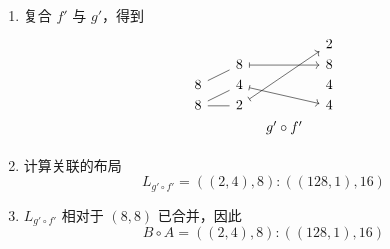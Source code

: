 \begin{example}
\begin{enumerate}
        \item 复合 $f'$ 与 $g'$，得到
        \[ \begin{tikzcd} [row sep = 1, column sep = 8]
         & & & & 2\\
         & & 8 \ar[rr,mapsto] & & 8\\
        8 \ar[urr,-] & & 4 \ar[drr,mapsto] & & 4\\
        8 \ar[rr,-] \ar[urr,-] & & 2 \ar[uuurr,mapsto] & & 4\\
         & & & g' \circ f' & \\
        \end{tikzcd} \]
        \item 计算关联的布局
        \[L_{g' \circ f'} = ((2,4),8) : ((128,1),16)\]
        \item $L_{g' \circ f'}$ 相对于 $(8,8)$ 已合并，因此
        \[B \circ A = ((2,4),8) : ((128,1),16)\]
    \end{enumerate}
\end{example}

